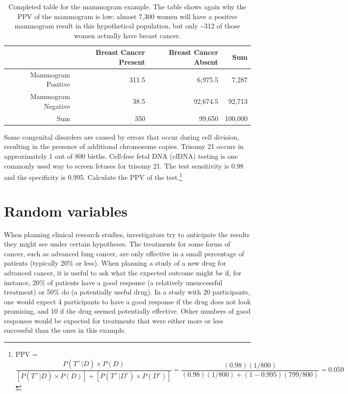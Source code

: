 \begin{table}[ht]
	\centering
	\begin{tabular}{rrrr}
		\hline
		& Breast Cancer Present & Breast Cancer Absent & Sum \\ 
		\hline
		Mammogram Positive & 311.5 & 6,975.5 & 7,287 \\ 
		Mammogram Negative &  38.5 & 92,674.5 & 92,713 \\ 
		Sum & 350 & 99,650 & 100,000 \\ 
		\hline
	\end{tabular}
	\caption{Completed table for the mammogram example. The table shows again why the PPV of the mammogram is low: almost 7,300 women will have a positive mammogram result in this hypothetical population, but only \textasciitilde312 of those women actually have breast cancer.}
	\label{tableMammogramExample}
\end{table}

\newpage

\begin{exercise}
	Some congenital disorders are caused by errors that occur during cell division, resulting in the presence of additional chromosome copies. Trisomy 21 occurs in approximately 1 out of 800 births. Cell-free fetal DNA (cfDNA) testing is one commonly used way to screen fetuses for trisomy 21. The test sensitivity is 0.98 and the specificity is 0.995. Calculate the PPV of the test.\footnote{PPV = $\dfrac{P(T^{+}|D) \times P(D)}{[P(T^{+}|D) \times P(D)] + [P(T^{+}|D^c) \times P(D^c)]} = \dfrac{(0.98)(1/800)}{(0.98)(1/800) + (1 - 0.995)(799/800)} = 0.059$}
\end{exercise}



\textC{\newpage}



\section{Random variables}
\label{randomVariablesSection}


When planning clinical research studies, investigators try to anticipate the results they might see under certain hypotheses. The treatments for some forms of cancer, such as advanced lung cancer, are only effective in a small percentage of patients (typically 20\% or less). When planning a study of a new drug for advanced cancer, it is useful to ask what the expected outcome might be if, for instance, 20\% of patients have a good response (a relatively unsuccessful treatment) or 50\% do (a potentially useful drug).  In a study with 20 participants, one would expect 4 participants to have a good response if the drug does not look promising, and 10 if the drug seemed potentially effective. Other numbers of good responses would be expected for treatments that were either more or less successful than the ones in this example. 

